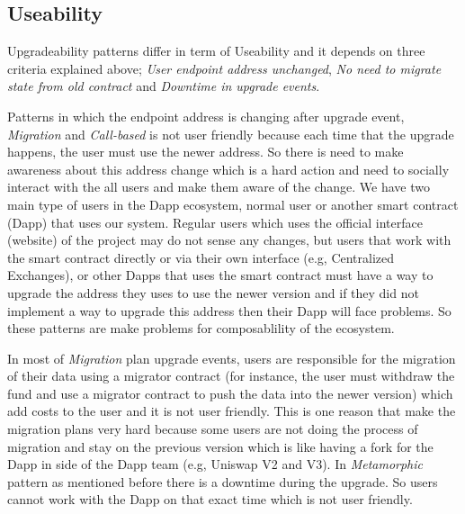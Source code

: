  \subsection{Useability}
 Upgradeability patterns differ in term of Useability and it depends on three criteria explained above; \textit{User endpoint address unchanged}, \textit{No need to migrate state from old contract} and \textit{Downtime in upgrade events}.

Patterns in which the endpoint address is changing after upgrade event, \textit{Migration} and \textit{Call-based} is not user friendly because each time that the upgrade happens, the user must use the newer address. So there is need to make awareness about this address change which is a hard action and need to socially interact with the all users and make them aware of the change. We have two main type of users in the Dapp ecosystem, normal user or another smart contract (Dapp) that uses our system. Regular users which uses the official interface (website) of the project may do not sense any changes, but users that work with the smart contract directly or via their own interface (e.g, Centralized Exchanges), or other Dapps that uses the smart contract must have a way to upgrade the address they uses to use the newer version and if they did not implement a way to upgrade this address then their Dapp will face problems. So these patterns are make problems for composablility of the ecosystem.

In most of \textit{Migration} plan upgrade events, users are responsible for the migration of their data using a migrator contract (for instance, the user must withdraw the fund and use a migrator contract to push the data into the newer version) which add costs to the user and it is not user friendly. This is one reason that make the migration plans very hard because some users are not doing the process of migration and stay on the previous version which is like having a fork for the Dapp in side of the Dapp team (e.g, Uniswap V2 and V3).
In \textit{Metamorphic} pattern as mentioned before there is a downtime during the upgrade. So users cannot work with the Dapp on that exact time which is not user friendly.


